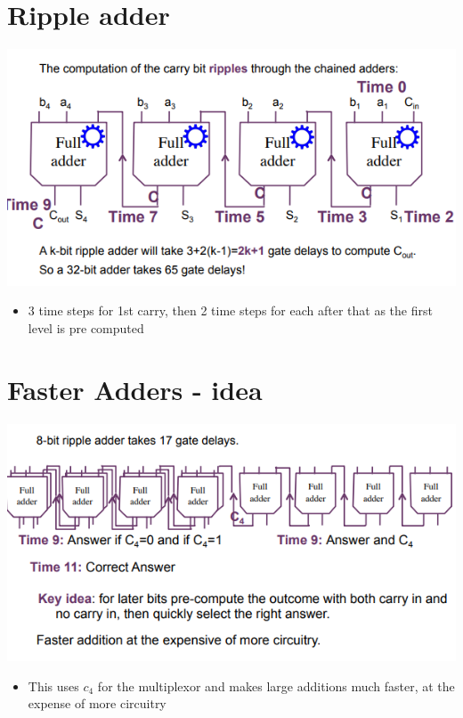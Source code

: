 \documentclass{article}[18pt]
\begin{document}
\section{Ripple adder}
\begin{center}
	\includegraphics[scale=0.7]{ripple_adder}
\end{center}
\begin{itemize}
	\item 3 time steps for 1st carry, then 2 time steps for each after that as the first level is pre computed
\end{itemize}
\section{Faster Adders - idea}
\begin{center}
	\includegraphics[scale=0.7]{faster_adders}
\end{center}
\begin{itemize}
	\item This uses $c_4$ for the multiplexor and makes large additions much faster, at the expense of more circuitry 
\end{itemize}
\end{document}
